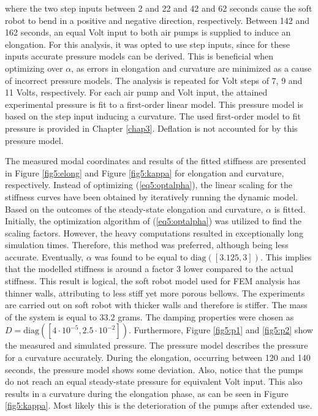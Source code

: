 where the two step inputs between 2 and 22 and 42 and 62 seconds cause the soft robot to bend in a positive and negative direction, respectively. Between 142 and 162 seconds, an equal Volt input to both air pumps is supplied to induce an elongation. For this analysis, it was opted to use step inputs, since for these inputs accurate pressure models can be derived. This is beneficial when optimizing over $\alpha$, as errors in elongation and curvature are minimized as a cause of incorrect pressure models. The analysis is repeated for Volt steps of 7, 9 and 11 Volts, respectively. For each air pump and Volt input, the attained experimental pressure is fit to a first-order linear model. This pressure model is based on the step input inducing a curvature. The used first-order model to fit pressure is provided in Chapter \ref{chap3}. Deflation is not accounted for by this pressure model. 

The measured modal coordinates and results of the fitted stiffness are presented in Figure \ref{fig5:elong} and Figure \ref{fig5:kappa} for elongation and curvature, respectively. Instead of optimizing (\ref{eq5:optalpha}), the linear scaling for the stiffness curves have been obtained by iteratively running the dynamic model. Based on the outcomes of the steady-state elongation and curvature, $\alpha$ is fitted. Initially, the optimization algorithm of (\ref{eq5:optalpha}) was utilized to find the scaling factors. However, the heavy computations resulted in exceptionally long simulation times. Therefore, this method was preferred, although being less accurate. Eventually, $\alpha$ was found to be equal to $\text{diag}([3.125,3])$. This implies that the modelled stiffness is around a factor 3 lower compared to the actual stiffness. This result is logical, the soft robot model used for FEM analysis has thinner walls, attributing to less stiff yet more porous bellows. The experiments are carried out on soft robot with thicker walls and therefore is stiffer. The mass of the system is equal to $33.2$ grams. The damping properties were chosen as $D = \text{diag}([4\cdot 10^{-5},2.5\cdot 10^{-2}])$. Furthermore, Figure \ref{fig5:p1} and \ref{fig5:p2} show the measured and simulated pressure. The pressure model describes the pressure for a curvature accurately. During the elongation, occurring between 120 and 140 seconds, the pressure model shows some deviation. Also, notice that the pumps do not reach an equal steady-state pressure for equivalent Volt input. This also results in a curvature during the elongation phase, as can be seen in Figure \ref{fig5:kappa}. Most likely this is the deterioration of the pumps after extended use. 

